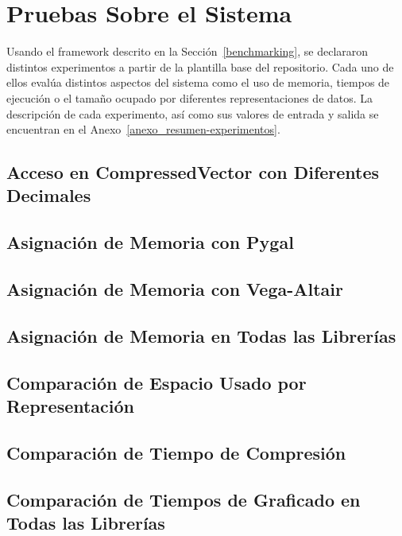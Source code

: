 \section{Pruebas Sobre el Sistema}
\label{sec:pruebas-sistema}

Usando el framework descrito en la Sección~\ref{benchmarking}, se declararon distintos experimentos a partir de la plantilla base del repositorio. Cada uno de ellos evalúa distintos aspectos del sistema como el uso de memoria, tiempos de ejecución o el tamaño ocupado por diferentes representaciones de datos. La descripción de cada experimento, así como sus valores de entrada y salida se encuentran en el Anexo~\ref{anexo_resumen-experimentos}.

\subsection{Acceso en CompressedVector con Diferentes Decimales}
\label{exp:cvd-access-decimals}

\subsection{Asignación de Memoria con Pygal}
\label{exp:pygal-mem}

\subsection{Asignación de Memoria con Vega-Altair}
\label{exp:altair-mem}

\subsection{Asignación de Memoria en Todas las Librerías}
\label{exp:all-libs-mem}

\subsection{Comparación de Espacio Usado por Representación}
\label{exp:space-comparison}

\subsection{Comparación de Tiempo de Compresión}
\label{exp:compression-time}

\subsection{Comparación de Tiempos de Graficado en Todas las Librerías}
\label{exp:all-libs-time}

